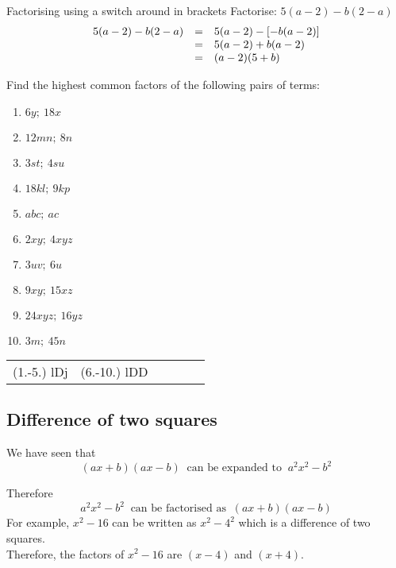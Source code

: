 \begin{wex}{Factorising using a switch around in brackets }{Factorise: $5(a-2)-b(2-a)$ }{
\begin{equation*}
\begin{array}{ccl}
\hfill 5(a-2)-b(2-a)& =& \hfill 5(a-2)-[-b(a-2)]  \\
&= & 5(a-2)+b(a-2)\\ 
& =& (a-2)(5+b) \hfill
\end{array}
\end{equation*}
}
\end{wex}

\begin{exercises}{}
{
Find the highest common factors of the
following pairs of terms:\par

\begin{multicols}{2}
\begin{enumerate}[label=\textbf{\arabic*}., itemsep=5pt]
\item $6y;~18x$
\item $12mn;~8n$
\item $3st;~4su$ 
\item $18kl;~9kp$
\item $abc;~ac$%
\item $2xy;~4xyz$
\item $3uv;~6u$ 
\item $9xy;~15xz$
\item $24xyz;~16yz$
\item $3m;~45n$
\end{enumerate}
\end{multicols}
\practiceinfo 
\par 
 \par \begin{tabular}[h]{cccccc}
 (1.-5.) lDj  &  (6.-10.) lDD  \end{tabular}
}
\end{exercises}

\subsection* {Difference of two squares}
We have seen that 
\begin{equation*}
(ax+b)(ax-b)~\mbox{ can be expanded to }~{a}^{2}{x}^{2}-{b}^{2}
\end{equation*}

Therefore
\begin{equation*}
{a}^{2}{x}^{2}-{b}^{2}~\mbox{ can be factorised as }~(ax+b)(ax-b)
\end{equation*}
For example, ${x}^{2}-16$ can be written as ${x}^{2}-{4}^{2}$ which is a difference of two squares. 
\\Therefore, the factors of ${x}^{2}-16$ are $(x-4)$ and $(x+4)$.\par 


